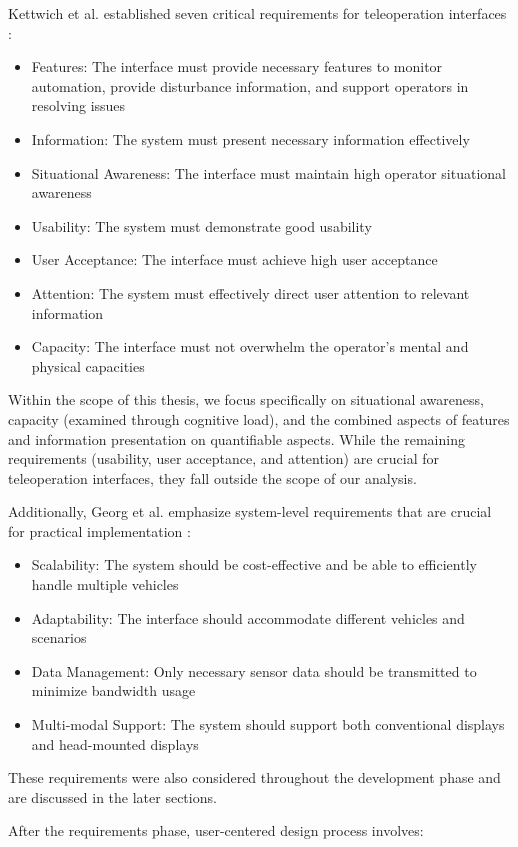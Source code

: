 Kettwich et al. established seven critical requirements for teleoperation interfaces \cite{Kettwich}:
\begin{itemize}
    \item Features: The interface must provide necessary features to monitor automation, provide disturbance information, and support operators in resolving issues
    \item Information: The system must present necessary information effectively
    \item Situational Awareness: The interface must maintain high operator situational awareness
    \item Usability: The system must demonstrate good usability
    \item User Acceptance: The interface must achieve high user acceptance
    \item Attention: The system must effectively direct user attention to relevant information
    \item Capacity: The interface must not overwhelm the operator's mental and physical capacities

\end{itemize}
Within the scope of this thesis, we focus specifically on situational awareness, capacity (examined through cognitive load), and the combined aspects of features and information presentation on quantifiable aspects. While the remaining requirements (usability, user acceptance, and attention) are crucial for teleoperation interfaces, they fall outside the scope of our analysis.

Additionally, Georg et al. emphasize system-level requirements that are crucial for practical implementation \cite{Georg}:
\begin{itemize}
    \item Scalability: The system should be cost-effective and be able to efficiently handle multiple vehicles
    \item Adaptability: The interface should accommodate different vehicles and scenarios
    \item Data Management: Only necessary sensor data should be transmitted to minimize bandwidth usage
    \item Multi-modal Support: The system should support both conventional displays and head-mounted displays
\end{itemize}
These requirements were also considered throughout the development phase and are discussed in the later sections.

After the requirements phase, user-centered design process involves:

